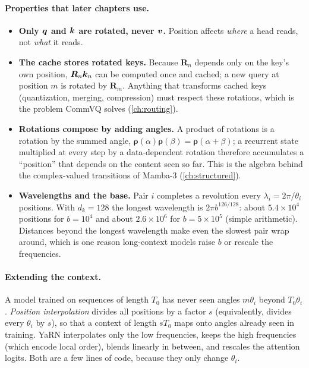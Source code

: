 \paragraph{Properties that later chapters use.}
\begin{itemize}
  \item \textbf{Only $\bm{q}$ and $\bm{k}$ are rotated, never $\bm{v}$.} Position affects \emph{where}
  a head reads, not \emph{what} it reads.
  \item \textbf{The cache stores rotated keys.} Because $\bm{R}_n$ depends only on the key's
  own position, $\bm{R}_n\bm{k}_n$ can be computed once and cached; a new query at position $m$
  is rotated by $\bm{R}_m$. Anything that transforms cached keys (quantization, merging,
  compression) must respect these rotations, which is the problem CommVQ solves
  (\cref{ch:routing}).
  \item \textbf{Rotations compose by adding angles.} A product of rotations is a rotation by
  the summed angle, $\bm{\rho}(\alpha)\bm{\rho}(\beta) = \bm{\rho}(\alpha+\beta)$; a
  recurrent state multiplied at every step by a data-dependent rotation therefore accumulates
  a ``position'' that depends on the content seen so far. This is the algebra behind the
  complex-valued transitions of Mamba-3 (\cref{ch:structured}).
  \item \textbf{Wavelengths and the base.} Pair $i$ completes a revolution every
  $\lambda_i = 2\pi/\theta_i$ positions. With $d_k = 128$ the longest wavelength is
  $2\pi b^{126/128}$: about $5.4\times 10^4$ positions for $b = 10^4$ and about
  $2.6\times 10^6$ for $b = 5\times 10^5$ (simple arithmetic). Distances beyond the longest
  wavelength make even the slowest pair wrap around, which is one reason long-context
  models raise $b$ or rescale the frequencies.
\end{itemize}

\paragraph{Extending the context.} A model trained on sequences of length $T_0$ has never
seen angles $m\theta_i$ beyond $T_0\theta_i$. \emph{Position interpolation}
\citep{c01-chen2023pi} divides all positions by a factor $s$ (equivalently, divides every
$\theta_i$ by $s$), so that a context of length $sT_0$ maps onto angles already seen in
training. YaRN \citep{c01-peng2023yarn} interpolates only the low frequencies, keeps the high
frequencies (which encode local order), blends linearly in between, and rescales the
attention logits. Both are a few lines of code, because they only change $\theta_i$.

